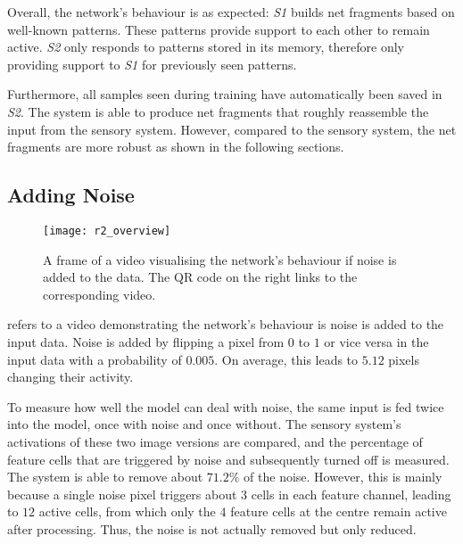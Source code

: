 Overall, the network's behaviour is as expected: \emph{S1} builds net fragments based on well-known patterns.
These patterns provide support to each other to remain active.
\emph{S2} only responds to patterns stored in its memory, therefore only providing support to \emph{S1} for previously seen patterns.

Furthermore, all samples seen during training have automatically been saved in \emph{S2}.
The system is able to produce net fragments that roughly reassemble the input from the sensory system.
However, compared to the sensory system, the net fragments are more robust as shown in the following sections.

























\subsection{Adding Noise}
%
\begin{figure}[h]
    \centering
    \texttt{[image: r2\_overview]}
    \caption[Video visualising the network's behaviour with noise in input]{A frame of a video visualising the network's behaviour if noise is added to the data. The QR code on the right links to the corresponding video.}
\end{figure}
%
 refers to a video demonstrating the network's behaviour is noise is added to the input data.
Noise is added by flipping a pixel from $0$ to $1$ or vice versa in the input data with a probability of $0.005$.
On average, this leads to $5.12$ pixels changing their activity.

To measure how well the model can deal with noise, the same input is fed twice into the model, once with noise and once without.
The sensory system's activations of these two image versions are compared, and the percentage of feature cells that are triggered by noise and subsequently turned off is measured.
The system is able to remove about $71.2\%$ of the noise.
However, this is mainly because a single noise pixel triggers about $3$ cells in each feature channel, leading to $12$ active cells, from which only the $4$ feature cells at the centre remain active after processing. Thus, the noise is not actually removed but only reduced.

